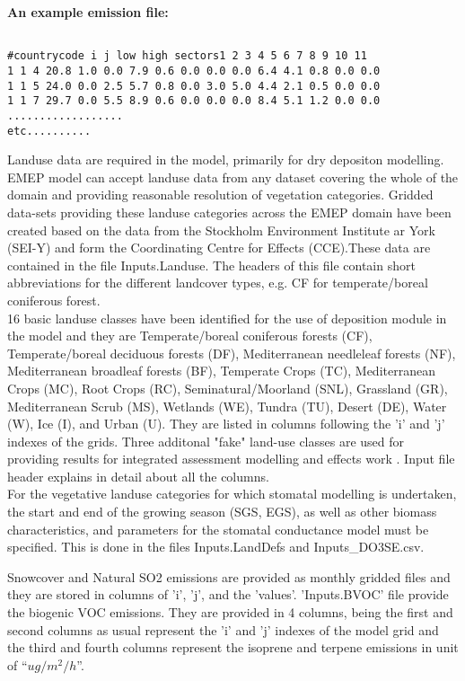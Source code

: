 \textbf{An example emission file:}

\begin{verbatim}

#countrycode i j low high sectors1 2 3 4 5 6 7 8 9 10 11 
1 1 4 20.8 1.0 0.0 7.9 0.6 0.0 0.0 0.0 6.4 4.1 0.8 0.0 0.0
1 1 5 24.0 0.0 2.5 5.7 0.8 0.0 3.0 5.0 4.4 2.1 0.5 0.0 0.0
1 1 7 29.7 0.0 5.5 8.9 0.6 0.0 0.0 0.0 8.4 5.1 1.2 0.0 0.0
..................
etc..........

\end{verbatim}

Landuse data are required in the model, primarily for dry
depositon modelling.  EMEP
model can accept landuse data from any dataset covering the whole of
the domain and providing reasonable resolution of vegetation
categories.  Gridded data-sets providing these landuse categories
across the EMEP domain have been created based on the data from the
Stockholm Environment Institute ar York (SEI-Y) and form the
Coordinating Centre for Effects (CCE).These data are contained in the file Inputs.Landuse. The headers of this file contain short abbreviations for the different landcover types, e.g. CF for temperate/boreal coniferous forest.  \\

 16 basic landuse classes have
been identified for the use of deposition module in the model and they
are Temperate/boreal coniferous forests (CF), Temperate/boreal
deciduous forests (DF), Mediterranean needleleaf forests (NF),
Mediterranean broadleaf forests (BF), Temperate Crops (TC),
Mediterranean Crops (MC), Root Crops (RC), Seminatural/Moorland (SNL),
Grassland (GR), Mediterranean Scrub (MS), Wetlands (WE), Tundra (TU),
Desert (DE), Water (W), Ice (I), and Urban (U).  They are listed in
columns following the 'i' and 'j' indexes of the
grids. Three additonal "fake" land-use classes are used for providing results for integrated assessment modelling and effects work . Input file header explains in detail about all the
columns. \\

For the vegetative landuse categories for which stomatal modelling is undertaken, the start and end of the growing season (SGS, EGS), as well as other biomass characteristics, and parameters for the stomatal conductance model must be specified. This is done in the files Inputs.LandDefs and Inputs_DO3SE.csv. 

Snowcover and Natural SO2 emissions are provided as monthly gridded
files and they are stored in columns of 'i', 'j', and the
'values'. 'Inputs.BVOC' file provide the biogenic VOC emissions.  They
are provided in 4 columns, being the first and second columns as usual
represent the 'i' and 'j' indexes of the model grid and the third and
fourth columns represent the isoprene and terpene emissions in unit of
``$ug/m^{2}/h$''.\\
 

